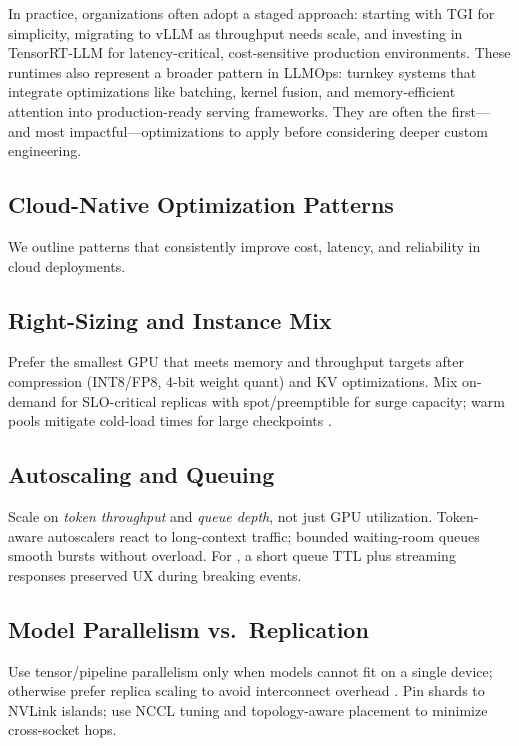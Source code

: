In practice, organizations often adopt a staged approach: starting with TGI for simplicity, migrating to vLLM as throughput needs scale, and investing in TensorRT-LLM for latency-critical, cost-sensitive production environments. These runtimes also represent a broader pattern in LLMOps: turnkey systems that integrate optimizations like batching, kernel fusion, and memory-efficient attention into production-ready serving frameworks. They are often the first—and most impactful—optimizations to apply before considering deeper custom engineering.

\subsection{Cloud-Native Optimization Patterns}
\label{sec:perf-cloud-native}
We outline patterns that consistently improve cost, latency, and reliability in cloud deployments.

\subsection{Right-Sizing and Instance Mix}
Prefer the smallest GPU that meets memory and throughput targets after compression (INT8/FP8, 4-bit weight quant) and KV optimizations. Mix on-demand for SLO-critical replicas with spot/preemptible for surge capacity; warm pools mitigate cold-load times for large checkpoints \cite{cloud-rightsizing,spot-capacity}.

\subsection{Autoscaling and Queuing}
\label{sec:perf-autoscaling-queue}
Scale on \emph{token throughput} and \emph{queue depth}, not just GPU utilization. Token-aware autoscalers react to long-context traffic; bounded waiting-room queues smooth bursts without overload. For \ishtar{}, a short queue TTL plus streaming responses preserved UX during breaking events.

\subsection{Model Parallelism vs.\ Replication}
Use tensor/pipeline parallelism only when models cannot fit on a single device; otherwise prefer replica scaling to avoid interconnect overhead \cite{parallelism-survey}. Pin shards to NVLink islands; use NCCL tuning and topology-aware placement to minimize cross-socket hops.

